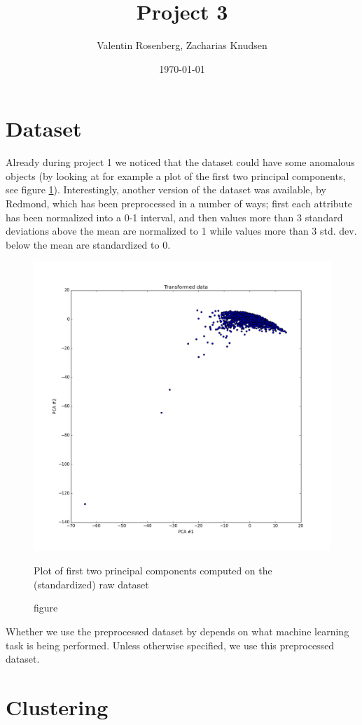 \documentclass[a4paper,10pt]{article}
\title{Project 3}
\author{Valentin Rosenberg, Zacharias Knudsen}
\date{\today}
\begin{document}
\maketitle



\section{Dataset}
Already during project 1 we noticed that the dataset could have some anomalous objects (by looking at for example a plot of the first two principal components, see figure \ref{fig_pca}). Interestingly, another version of the dataset was available, by Redmond\cite{redmond09}, which has been preprocessed in a number of ways; first each attribute has been normalized into a 0-1 interval, and then values more than 3 standard deviations above the mean are normalized to 1 while values more than 3 std. dev. below the mean are standardized to 0.

\begin{figure}[H]
\centering
  \includegraphics[width=0.7\linewidth]{fig_pca_raw}
  \caption{figure}{Plot of first two principal components computed on the (standardized) raw dataset}
  \label{fig_pca}
\end{figure}

Whether we use the preprocessed dataset by \cite{redmond09} depends on what machine learning task is being performed. Unless otherwise specified, we use this preprocessed dataset.

\section{Clustering}
\end{document}
